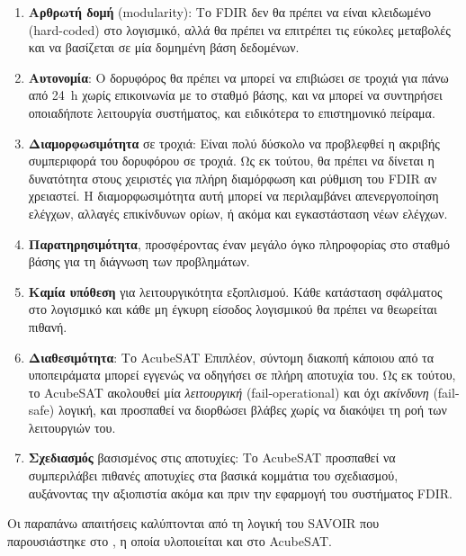 \documentclass[a4paper,nobib]{tufte-book}
\begin{document}
\begin{enumerate}
	\item \textbf{Αρθρωτή δομή} (modularity): Το \acs{FDIR} δεν θα πρέπει να είναι κλειδωμένο (hard-coded) στο λογισμικό, αλλά θα πρέπει να επιτρέπει τις εύκολες μεταβολές και να βασίζεται σε μία δομημένη βάση δεδομένων.
	\item \textbf{Αυτονομία}: Ο δορυφόρος θα πρέπει να μπορεί να επιβιώσει σε τροχιά για πάνω από \SI{24}{\hour} χωρίς επικοινωνία με το σταθμό βάσης, και να μπορεί να συντηρήσει οποιαδήποτε λειτουργία συστήματος, και ειδικότερα το επιστημονικό πείραμα.
	\item \textbf{Διαμορφωσιμότητα} σε τροχιά: Είναι πολύ δύσκολο να προβλεφθεί η ακριβής συμπεριφορά του δορυφόρου σε τροχιά. Ως εκ τούτου, θα πρέπει να δίνεται η δυνατότητα στους χειριστές για πλήρη διαμόρφωση και ρύθμιση του \acs{FDIR} αν χρειαστεί. Η διαμορφωσιμότητα αυτή μπορεί να περιλαμβάνει απενεργοποίηση ελέγχων, αλλαγές επικίνδυνων ορίων, ή ακόμα και εγκαστάσταση νέων ελέγχων.
	\item \textbf{Παρατηρησιμότητα}, προσφέροντας έναν μεγάλο όγκο πληροφορίας στο σταθμό βάσης για τη διάγνωση των προβλημάτων.
	\item \textbf{Καμία υπόθεση} για λειτουργικότητα εξοπλισμού. Κάθε κατάσταση σφάλματος στο λογισμικό και κάθε μη έγκυρη είσοδος λογισμικού θα πρέπει να θεωρείται πιθανή.
	\item \textbf{Διαθεσιμότητα}: Το AcubeSAT  Επιπλέον, σύντομη διακοπή κάποιου από τα υποπειράματα μπορεί εγγενώς να οδηγήσει σε πλήρη αποτυχία του. Ως εκ τούτου, το AcubeSAT ακολουθεί μία \emph{λειτουργική} (fail-operational) και όχι \emph{ακίνδυνη} (fail-safe) λογική, και προσπαθεί να διορθώσει βλάβες χωρίς να διακόψει τη ροή των λειτουργιών του.
	\item \textbf{Σχεδιασμός} βασισμένος στις αποτυχίες: Το AcubeSAT προσπαθεί να συμπεριλάβει πιθανές αποτυχίες στα βασικά κομμάτια του σχεδιασμού, αυξάνοντας την αξιοπιστία ακόμα και πριν την εφαρμογή του συστήματος \acs{FDIR}.
\end{enumerate}

Οι παραπάνω απαιτήσεις καλύπτονται από τη λογική του \acs{SAVOIR} που παρουσιάστηκε στο , η οποία υλοποιείται και στο AcubeSAT.
\end{document}
